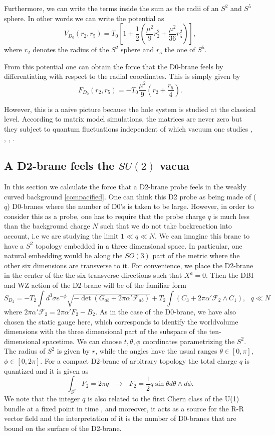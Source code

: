 \documentclass[11pt,english]{article}
\newcommand{\be}{\begin{equation}}
\newcommand{\ee}{\end{equation}}
\numberwithin{equation}{section}
\begin{document}
\noindent
Furthermore, we can write the terms inside the sum as the radii of an $S^2$ and $S^5$ sphere. In other words we can write the potential as  
\be 
V_{D_0}(r_2,r_5)=T_0\left[1+\frac{1}{2}\left(\frac{\mu^2}{9}r_2^2+\frac{\mu^2}{36}r_5^2\right)\right],
\ee
where $r_2$ denotes the radius of the $S^2$ sphere and $r_5$ the one of $S^5$. 

\noindent
From this potential one can obtain the force that the D0-brane feels by differentiating with respect to the radial coordinates. This is simply given by 
\be 
F_{D_0}(r_2,r_5)=-T_0\frac{\mu^2}{9}\left(r_2+\frac{r_5}{4}\right).
\ee  

\noindent 
However, this is a naive picture because the hole system is studied at the classical level. According to matrix model simulations, the matrices are never zero but they subject to quantum fluctuations independent of which vacuum one studies \cite{Bergner2019}, \cite{Catterall2010}, \cite{Hanada2014}, \cite{Masanori2017}.  



\subsection{A D2-brane feels the $SU(2)$ vacua}\label{D2analysis}
In this section we calculate the force that a D2-brane probe feels in the weakly curved background \eqref{compacified}. One can think this D2 probe as being made of ($q$) D0-branes where the number of D0's is taken to be large. However, in order to consider this as a probe, one has to require that the probe charge $q$ is much less than the background charge $N$ such that we do not take backreaction into account, i.e we are studying the limit $1\ll q\ll N$. We can imagine this brane to have a $S^2$ topology embedded in a three dimensional space. In particular, one natural embedding would be along the $SO(3)$ part of the metric where the other six dimensions are transverse to it. For convenience, we place the D2-brane in the center of the the six transverse directions such that $X^a=0$. Then the DBI and WZ action of the D2-brane will be of the familiar form 
\be \label{D2action}
S_{D_2}=-T_2\int d^3\sigma e^{-\phi}\sqrt{-\det\left(G_{ab}+2\pi\alpha'\mathcal{F}_{ab}\right)}+T_2\int\left(C_3+2\pi\alpha'\mathcal{F}_2\wedge C_1\right),~~~q\ll N
\ee    
where $2\pi\alpha'\mathcal{F}_2=2\pi\alpha'F_2-B_2$. As in the case of the D0-brane, we have also chosen the static gauge here, which corresponds to identify the worldvolume dimensions with the three dimensional part of the subspace of the ten-dimensional spacetime. We can choose $t,\theta, \phi$ coordinates parametrizing the $S^2$. The radius of $S^2$ is given by $r$, while the angles have the usual ranges $\theta\in [0,\pi]$, $\phi\in[0,2\pi]$. For a compact D2-brane of arbitrary topology the total  charge $q$ is quantized and it is given as  
\be 
\int_{S^2}F_2=2\pi q ~~~\longrightarrow~~~ F_2=\frac{1}{2}q\sin\theta d\theta\wedge d\phi.
\ee 
We note that the integer $q$ is also related to the first Chern class of the U(1) bundle at a fixed point in time \cite{Figueroa-OFarrill2000}, \cite{Stanciu2000} and moreover, it acts as a source for the R-R vector field and the interpretation of it is the number of D0-branes that are bound on the surface of the D2-brane. 
\end{document}
